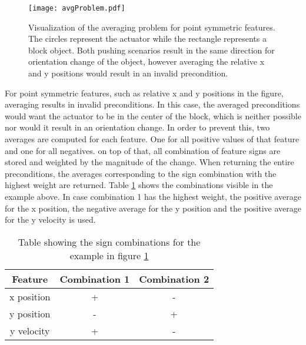 \begin{figure}
	\centering
	\texttt{[image: avgProblem.pdf]}
	\caption{Visualization of the averaging problem for point symmetric features. The circles represent the actuator while the rectangle represents a block object. Both pushing scenarios result in the same direction for orientation change of the object, however averaging the relative x and y positions would result in an invalid precondition.} 
	\label{fig:avgProblem}
\end{figure}

For point symmetric features, such as relative x and y positions in the figure, averaging results in invalid preconditions. In this case, the averaged preconditions would want the actuator to be in the center of the block, which is neither possible nor would it result in an orientation change. In order to prevent this, two averages are computed for each feature. One for all positive values of that feature and one for all negatives. on top of that, all combination of feature signs are stored and weighted by the magnitude of the change. When returning the entire preconditions, the averages corresponding to the sign combination with the highest weight are returned. Table \ref{tab:signCombinations} shows the combinations visible in the example above. In case combination 1 has the highest weight, the positive average for the x position, the negative average for the y position and the positive average for the y velocity is used. 

\begin{table}
	\centering
	\begin{tabular}{|c|c|c|}
		\hline Feature & Combination 1 & Combination 2 \\ 
		\hline x position & + & - \\ 
		\hline y position & - & + \\ 
		\hline y velocity & + & - \\ 
		\hline 
	\end{tabular} 
	\caption{Table showing the sign combinations for the example in figure \ref{fig:avgProblem}}
	\label{tab:signCombinations}
\end{table}

